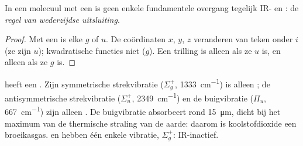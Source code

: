 \begin{proposition}\label{prop:b3:group-theory-applied:mutual-exclusion}
In een molecuul met een  is geen enkele fundamentele
overgang tegelijk IR- en : de \emph{regel van wederzijdse
uitsluiting}.
\end{proposition}

\begin{proof}
Met een  is elke  $g$ of $u$. De
coördinaten $x$, $y$, $z$ veranderen van teken onder $i$ (ze zijn $u$);
kwadratische functies niet ($g$). Een trilling is alleen  als ze
$u$ is, en alleen  als ze
$g$ is.
\end{proof}

\begin{example}\label{ex:b3:group-theory-applied:co2}
 heeft een . Zijn symmetrische strekvibratie ($\Sigma_g^+$,
\qty{1333}{cm^{-1}}) is alleen ; de antisymmetrische
strekvibratie ($\Sigma_u^+$,
\qty{2349}{cm^{-1}}) en de buigvibratie ($\Pi_u$, \qty{667}{cm^{-1}}) zijn
alleen .
De buigvibratie absorbeert rond \qty{15}{\micro m}, dicht bij het maximum
van de thermische straling van de aarde: daarom is koolstofdioxide een
broeikasgas.  en
 hebben één enkele vibratie, $\Sigma_g^+$: IR-inactief.
\end{example}

